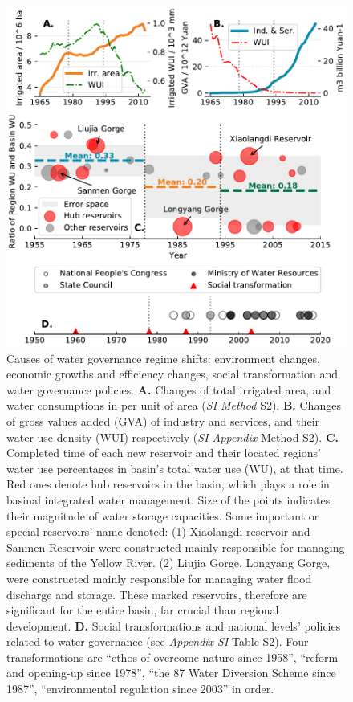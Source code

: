 \documentclass[9pt, twocolumn, twoside, lineno]{pnas-new}
\begin{document}
\begin{figure}[th!]
	\centering
	\includegraphics[width=\linewidth]{../../figures/main/causes.pdf}
	\caption{
		Causes of water governance regime shifts: environment changes, economic growths and efficiency changes, social transformation and water governance policies.
		\textbf{A.} Changes of total irrigated area, and water consumptions in per unit of area (\textit{SI Method} S2).
		\textbf{B.} Changes of gross values added (GVA) of industry and services, and their water use density (WUI) respectively (\textit{SI Appendix} Method S2).
		\textbf{C.} Completed time of each new reservoir and their located regions' water use percentages in basin's total water use (WU), at that time. Red ones denote hub reservoirs in the basin, which plays a role in basinal integrated water management. Size of the points indicates their magnitude of water storage capacities. Some important or special reservoirs' name denoted: (1) Xiaolangdi reservoir and Sanmen Reservoir were constructed mainly responsible for managing sediments of the Yellow River. (2) Liujia Gorge, Longyang Gorge, were constructed mainly responsible for managing water flood discharge and storage. These marked reservoirs, therefore are significant for the entire basin, far crucial than regional development.
		\textbf{D.} Social transformations and national levels' policies related to water governance (see \textit{Appendix SI} Table S2). Four transformations are ``ethos of overcome nature since 1958'', ``reform and opening-up since 1978'', ``the 87 Water Diversion Scheme since 1987'', ``environmental regulation since 2003'' in order.
	}
	\label{fig:Causes}
\end{figure}
\end{document}
